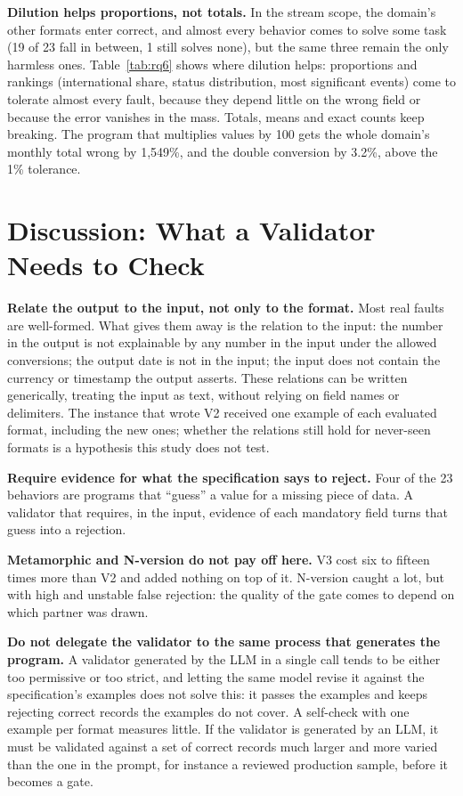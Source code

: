 \documentclass[sigconf,nonacm]{acmart}
\begin{document}
\textbf{Dilution helps proportions, not totals.} In the stream scope, the domain's other formats enter correct, and almost every behavior comes to solve some task (19 of 23 fall in between, 1 still solves none), but the same three remain the only harmless ones. Table~\ref{tab:rq6} shows where dilution helps: proportions and rankings (international share, status distribution, most significant events) come to tolerate almost every fault, because they depend little on the wrong field or because the error vanishes in the mass. Totals, means and exact counts keep breaking. The program that multiplies values by 100 gets the whole domain's monthly total wrong by 1{,}549\%, and the double conversion by 3.2\%, above the 1\% tolerance.

\section{Discussion: What a Validator Needs to Check}

\textbf{Relate the output to the input, not only to the format.} Most real faults are well-formed. What gives them away is the relation to the input: the number in the output is not explainable by any number in the input under the allowed conversions; the output date is not in the input; the input does not contain the currency or timestamp the output asserts. These relations can be written generically, treating the input as text, without relying on field names or delimiters. The instance that wrote V2 received one example of each evaluated format, including the new ones; whether the relations still hold for never-seen formats is a hypothesis this study does not test.

\textbf{Require evidence for what the specification says to reject.} Four of the 23 behaviors are programs that ``guess'' a value for a missing piece of data. A validator that requires, in the input, evidence of each mandatory field turns that guess into a rejection.

\textbf{Metamorphic and N-version do not pay off here.} V3 cost six to fifteen times more than V2 and added nothing on top of it. N-version caught a lot, but with high and unstable false rejection: the quality of the gate comes to depend on which partner was drawn.

\textbf{Do not delegate the validator to the same process that generates the program.} A validator generated by the LLM in a single call tends to be either too permissive or too strict, and letting the same model revise it against the specification's examples does not solve this: it passes the examples and keeps rejecting correct records the examples do not cover. A self-check with one example per format measures little. If the validator is generated by an LLM, it must be validated against a set of correct records much larger and more varied than the one in the prompt, for instance a reviewed production sample, before it becomes a gate.
\end{document}
